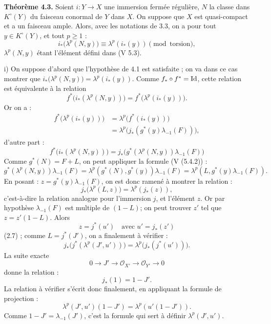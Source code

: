\textbf{Théorème 4.3.} Soient \(i:Y\to X\) une immersion fermée régulière, \(N\) la classe dans \(K^\circ(Y)\) du faisceau conormal de \(Y\) dans \(X\). On suppose que \(X\) est quasi-compact et a un faisceau ample. Alors, avec les notations de 3.3, on a pour tout \(y\in K^\circ(Y)\), et tout \(p\ge1\) :
\begin{equation}\tag{4.3.1}
 i_*\bigl(\lambda^p(N,y)\bigr)\equiv \lambda^p(i_*(y))
 \pmod{\text{torsion}},
\end{equation}
\(\lambda^p(N,y)\) étant l'élément défini dans (V 5.3).

i) On suppose d'abord que l'hypothèse de 4.1 est satisfaite ; on va dans ce cas montrer que \(i_*\bigl(\lambda^p(N,y)\bigr)=\lambda^p(i_*(y))\). Comme \(f_*\circ f^*=\operatorname{Id}\), cette
relation est équivalente à la relation
\[
  f^*\bigl(i_*(\lambda^p(N,y))\bigr)=
  f^*\bigl(\lambda^p(i_*(y))\bigr).
\]
Or on a :
\[
\begin{aligned}
 f^*\bigl(\lambda^p(i_*(y))\bigr)
 &=\lambda^p\bigl(f^*(i_*(y))\bigr)\\
 &=\lambda^p\bigl(j_*(g^*(y)\lambda_{-1}(F))\bigr),
\end{aligned}
\tag{3.4}
\]
d'autre part :
\[
  f^*\bigl(i_*(\lambda^p(N,y))\bigr)
  =
  j_*\bigl(g^*(\lambda^p(N,y))\lambda_{-1}(F)\bigr)
  \tag{3.4}
\]
Comme \(g^*(N)=F+L\), on peut appliquer la formule (V (5.4.2)) :
\[
  g^*(\lambda^p(N,y))\lambda_{-1}(F)
  =
  \lambda^p(g^*(N),g^*(y))\lambda_{-1}(F)
  =
  \lambda^p(L,g^*(y)\lambda_{-1}(F)).
\]
En posant : \(z=g^*(y)\lambda_{-1}(F)\), on est donc ramené à montrer la relation :
\[
  j_*\bigl(\lambda^p(L,z)\bigr)=\lambda^p(j_*(z)),
\]
c'est-à-dire la relation analogue pour l'immersion \(j\), et l'élément \(z\). Or par hypothèse \(\lambda_{-1}(F)\) est multiple de \((1-L)\); on peut trouver \(z'\) tel que \(z=z'(1-L)\). Alors
\[
  z=j^*(u')\quad\text{avec }u'=j_*(z')
\]
(2.7) ; comme \(L=j^*(J')\), on a finalement à vérifier :
\[
  j_*\bigl(j^*(\lambda^p(J',u'))\bigr)=
  \lambda^p\bigl(j_*(j^*(u'))\bigr).
\]
La suite exacte
\[
  0\longrightarrow J'\longrightarrow \mathcal O_{X'}
  \longrightarrow \mathcal O_{Y'}\longrightarrow 0
\]
donne la relation :
\begin{equation}\tag{4.3.2}
  j_*(1)=1-J'.
\end{equation}
La relation à vérifier s'écrit donc finalement, en appliquant la formule de
projection :
\[
  \lambda^p(J',u')(1-J')=\lambda^p(u'(1-J')).
\]
Comme \(1-J'=\lambda_{-1}(J')\), c'est la formule qui sert à définir \(\lambda^p(J',u')\).


